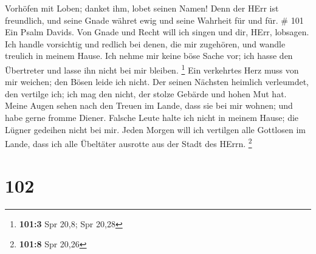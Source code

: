 Vorhöfen mit Loben; danket ihm, lobet seinen Namen!  Denn
der HErr ist freundlich, und seine Gnade währet ewig und seine Wahrheit
für und für. \# 101  Ein Psalm Davids. Von Gnade und Recht
will ich singen und dir, HErr, lobsagen.  Ich handle
vorsichtig und redlich bei denen, die mir zugehören, und wandle treulich
in meinem Hause.  Ich nehme mir keine böse Sache vor; ich
hasse den Übertreter und lasse ihn nicht bei mir bleiben. \footnote{\textbf{101:3}
  Spr 20,8; Spr 20,28}  Ein verkehrtes Herz muss von mir
weichen; den Bösen leide ich nicht.  Der seinen Nächsten
heimlich verleumdet, den vertilge ich; ich mag den nicht, der stolze
Gebärde und hohen Mut hat.  Meine Augen sehen nach den
Treuen im Lande, dass sie bei mir wohnen; und habe gerne fromme Diener.
 Falsche Leute halte ich nicht in meinem Hause; die Lügner
gedeihen nicht bei mir.  Jeden Morgen will ich vertilgen
alle Gottlosen im Lande, dass ich alle Übeltäter ausrotte aus der Stadt
des HErrn. \footnote{\textbf{101:8} Spr 20,26}

\hypertarget{section-32}{%
\section{102}\label{section-32}}

